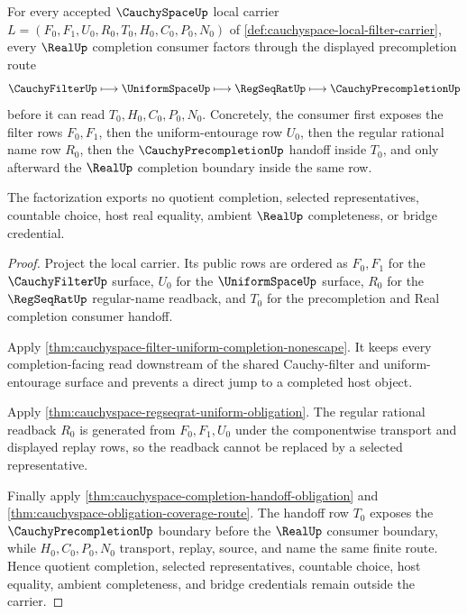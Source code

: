 \begin{theorem}
\label{thm:cauchyspace-precompletion-factorization}
For every accepted $\CauchySpaceUp$ local carrier $L=(F_0,F_1,U_0,R_0,T_0,H_0,C_0,P_0,N_0)$ of \autoref{def:cauchyspace-local-filter-carrier}, every $\RealUp$ completion consumer factors through the displayed precompletion route
$$
\CauchyFilterUp \longmapsto \UniformSpaceUp \longmapsto \RegSeqRatUp \longmapsto \CauchyPrecompletionUp
$$
before it can read $T_0,H_0,C_0,P_0,N_0$. Concretely, the consumer first exposes the filter rows $F_0,F_1$, then the uniform-entourage row $U_0$, then the regular rational name row $R_0$, then the $\CauchyPrecompletionUp$ handoff inside $T_0$, and only afterward the $\RealUp$ completion boundary inside the same row.

The factorization exports no quotient completion, selected representatives, countable choice, host real equality, ambient $\RealUp$ completeness, or bridge credential.
\end{theorem}
\begin{proof}
Project the local carrier. Its public rows are ordered as $F_0,F_1$ for the $\CauchyFilterUp$ surface, $U_0$ for the $\UniformSpaceUp$ surface, $R_0$ for the $\RegSeqRatUp$ regular-name readback, and $T_0$ for the precompletion and Real completion consumer handoff.

Apply \autoref{thm:cauchyspace-filter-uniform-completion-nonescape}. It keeps every completion-facing read downstream of the shared Cauchy-filter and uniform-entourage surface and prevents a direct jump to a completed host object.

Apply \autoref{thm:cauchyspace-regseqrat-uniform-obligation}. The regular rational readback $R_0$ is generated from $F_0,F_1,U_0$ under the componentwise transport and displayed replay rows, so the readback cannot be replaced by a selected representative.

Finally apply \autoref{thm:cauchyspace-completion-handoff-obligation} and \autoref{thm:cauchyspace-obligation-coverage-route}. The handoff row $T_0$ exposes the $\CauchyPrecompletionUp$ boundary before the $\RealUp$ consumer boundary, while $H_0,C_0,P_0,N_0$ transport, replay, source, and name the same finite route. Hence quotient completion, selected representatives, countable choice, host equality, ambient completeness, and bridge credentials remain outside the carrier.
\end{proof}

